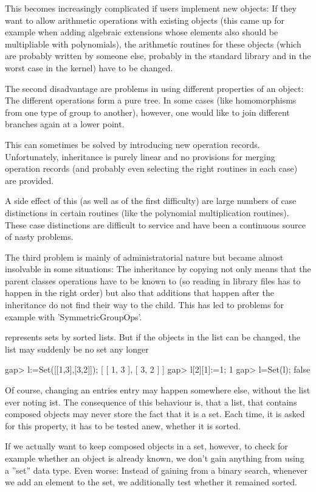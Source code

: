 This becomes increasingly complicated if users implement new objects: If
they want to allow arithmetic operations with existing objects (this came
up for example when
adding algebraic extensions whose elements also should be multipliable with
polynomials), the arithmetic routines for these objects (which are probably
written by someone else, probably in the standard library and in the worst
case in the kernel) have to be changed.

The second disadvantage are problems in using different properties of an
object: The different operations form a pure tree. In some cases (like
homomorphisms from one type of group to another), however, one would like to
join different branches again at a lower point.

This can sometimes be solved by introducing new operation records.
Unfortunately, inheritance is purely linear and no provisions for
merging operation records (and probably even selecting the right routines in
each case) are provided.

A side effect of this (as well as of the first difficulty) are large numbers
of case distinctions in certain routines (like the polynomial multiplication
routines). These case distinctions are difficult to service and have been a
continuous source of nasty problems.

The third problem is mainly of administratorial nature but became almost
insolvable in some situations: The inheritance by copying not only means
that the parent classes operations have to be known to {\GAP} (so reading in
library files has to happen in the right order) but also that additions that
happen after the inheritance do not find their way to the child. This has led
to problems for example with 'SymmetricGroupOps'.


{\GAP} represents sets by sorted lists. But if the objects in the list can
be changed, the list may suddenly be no set any longer

\beginexample
gap> l:=Set([[1,3],[3,2]]);
[ [ 1, 3 ], [ 3, 2 ] ]
gap> l[2][1]:=1;
1
gap> l=Set(l);  
false
\endexample

Of course, changing an entries entry may happen somewhere else, without the
list ever noting ist. The consequence of this behaviour is, that a list,
that contains composed objects may never store the fact that it is a set.
Each time, it is asked for this property, it has to be tested anew, whether
it is sorted.

If we actually want to keep composed objects in a set, however, to check
for example whether an object is already known, we don't gain anything from
using a ''set'' data type. Even worse: Instead of gaining from a binary
search, whenever we add an element to the set, we additionally test whether
it remained sorted.

